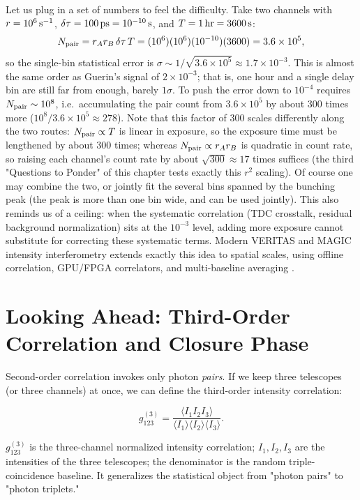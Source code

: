 Let us plug in a set of numbers to feel the difficulty. Take two channels with \(r=10^{6}\,{\rm s^{-1}}\), \(\delta\tau=100\,{\rm ps}=10^{-10}\,{\rm s}\), and \(T=1\,{\rm hr}=3600\,{\rm s}\):
\[
  N_{\rm pair}=r_Ar_B\,\delta\tau\,T
  =(10^6)(10^6)(10^{-10})(3600)
  =3.6\times10^{5},
\]
so the single-bin statistical error is \(\sigma\sim1/\sqrt{3.6\times10^5}\approx1.7\times10^{-3}\). This is almost the same order as Guerin's signal of \(2\times10^{-3}\); that is, one hour and a single delay bin are still far from enough, barely \(1\sigma\). To push the error down to \(10^{-4}\) requires \(N_{\rm pair}\sim10^{8}\), i.e.\ accumulating the pair count from \(3.6\times10^5\) by about \(300\) times more (\(10^8/3.6\times10^5\approx278\)). Note that this factor of 300 scales differently along the two routes: \(N_{\rm pair}\propto T\) is linear in exposure, so the exposure time must be lengthened by about \(300\) times; whereas \(N_{\rm pair}\propto r_Ar_B\) is quadratic in count rate, so raising each channel's count rate by about \(\sqrt{300}\approx17\) times suffices (the third "Questions to Ponder" of this chapter tests exactly this \(r^2\) scaling). Of course one may combine the two, or jointly fit the several bins spanned by the bunching peak (the peak is more than one bin wide, and can be used jointly). This also reminds us of a ceiling: when the systematic correlation (TDC crosstalk, residual background normalization) sits at the \(10^{-3}\) level, adding more exposure cannot substitute for correcting these systematic terms. Modern VERITAS and MAGIC intensity interferometry extends exactly this idea to spatial scales, using offline correlation, GPU/FPGA correlators, and multi-baseline averaging \citep{2020NatAs...4.1164A,2024MNRAS.529.4387A}.

\section{Looking Ahead: Third-Order Correlation and Closure Phase}
\label{sec:e08-g3}

Second-order correlation invokes only photon \emph{pairs}. If we keep three telescopes (or three channels) at once, we can define the third-order intensity correlation:

\begin{equation}
  g^{(3)}_{123}=\frac{\big\langle I_1 I_2 I_3\big\rangle}
  {\big\langle I_1\big\rangle\big\langle I_2\big\rangle\big\langle I_3\big\rangle}.
  \label{eq:e08-g3}
\end{equation}
\begin{formulaexplain}
\(g^{(3)}_{123}\) is the three-channel normalized intensity correlation; \(I_1,I_2,I_3\) are the intensities of the three telescopes; the denominator is the random triple-coincidence baseline. It generalizes the statistical object from "photon pairs" to "photon triplets."
\end{formulaexplain}

